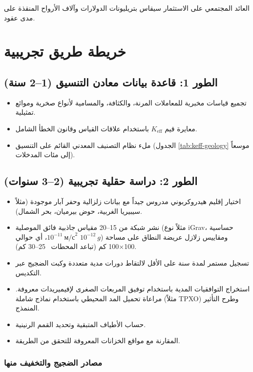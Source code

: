 \documentclass[12pt,a4paper]{article}
\newcommand{\Keff}{K_{\mathrm{eff}}}
\theoremstyle{remark}
\begin{document}
	العائد المجتمعي على الاستثمار سيقاس بتريليونات الدولارات وآلاف الأرواح المنقذة على مدى عقود.
	
	\section{خريطة طريق تجريبية}
	\label{sec:roadmap}
	
	\subsection{الطور 1: قاعدة بيانات معادن التنسيق (1–2 سنة)}
	
	\begin{itemize}
		\item تجميع قياسات مخبرية للمعاملات المرنة، والكثافة، والمسامية لأنواع صخرية وموائع تمثيلية.
		\item معايرة قيم \(\Keff\) باستخدام علاقات القياس وقانون الخطأ الشامل.
		\item ملء نظام التصنيف المعدني القائم على التنسيق (الجدول \ref{tab:keff-geology} موسعاً إلى مئات المدخلات).
	\end{itemize}
	
	\subsection{الطور 2: دراسة حقلية تجريبية (2–3 سنوات)}
	
	\begin{itemize}
		\item اختيار إقليم هيدروكربوني مدروس جيداً مع بيانات زلزالية وحفر آبار موجودة (مثلاً سيبيريا الغربية، حوض بيرميان، بحر الشمال).
		\item نشر شبكة من 15–20 مقياس جاذبية فائق الموصلية (مثلاً نوع iGrav، حساسية \(10^{-11}\ \text{м/с}^2\)، أي حوالي \(10^{-12}\ g\)) ومقاييس زلازل عريضة النطاق على مساحة 100×100 كم (تباعد المحطات ~25–30 كم).
		\item تسجيل مستمر لمدة سنة على الأقل لالتقاط دورات مدية متعددة وكبت الضجيج عبر التكديس.
		\item استخراج التوافقيات المدية باستخدام توفيق المربعات الصغرى لإفيميريدات معروفة. مراعاة تحميل المد المحيطي باستخدام نماذج شاملة (مثلاً TPXO) وطرح التأثير المنمذج.
		\item حساب الأطياف المتبقية وتحديد القمم الرنينية.
		\item المقارنة مع مواقع الخزانات المعروفة للتحقق من الطريقة.
	\end{itemize}
	
	\subsubsection{مصادر الضجيج والتخفيف منها}
	
\end{document}
